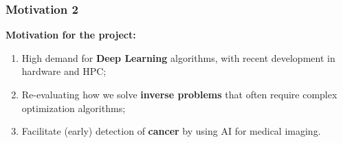   \begin{frame}
    \frametitle{Motivation 2}
  
    \begin{exampleblock}{\textbf{Motivation for the project:}}      
      \begin{enumerate}
        \item High demand for \textbf{Deep Learning} algorithms, with recent development in hardware and HPC; %
        \item Re-evaluating how we solve \textbf{inverse problems} that often require complex optimization algorithms; %
        \item Facilitate (early) detection of \textbf{cancer} by using AI for medical imaging. %
      \end{enumerate}
    \end{exampleblock}


  \end{frame}

